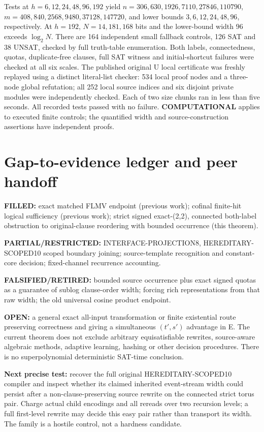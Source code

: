 \documentclass[11pt]{article}
\begin{document}
Tests at \(h=6,12,24,48,96,192\) yield \(n=306,630,1926,7110,27846,110790\), \(m=408,840,2568,9480,37128,147720\), and lower bounds \(3,6,12,24,48,96\), respectively. At \(h=192\), \(N=14{,}181{,}168\) bits and the lower-bound width \(96\) exceeds \(\log_2N\). There are 164 independent small fallback controls, 126 SAT and 38 UNSAT, checked by full truth-table enumeration. Both labels, connectedness, quotas, duplicate-free clauses, full SAT witness and initial-shortcut failures were checked at all six scales. The published original U local certificate was freshly replayed using a distinct literal-list checker: 534 local proof nodes and a three-node global refutation; all 252 local source indices and six disjoint private modules were independently checked. Each of two size chunks ran in less than five seconds. All recorded tests passed with no failure. \textbf{COMPUTATIONAL} applies to executed finite controls; the quantified width and source-construction assertions have independent proofs.

\section{Gap-to-evidence ledger and peer handoff}
\noindent\textbf{FILLED:} exact matched FLMV endpoint (previous work); cofinal finite-hit logical sufficiency (previous work); strict signed exact-(2,2), connected both-label obstruction to original-clause reordering with bounded occurrence (this theorem).
\par\noindent\textbf{PARTIAL/RESTRICTED:} INTERFACE-PROJECTION8, HEREDITARY-SCOPED10 scoped boundary joining; source-template recognition and constant-core decision; fixed-channel recurrence accounting.
\par\noindent\textbf{FALSIFIED/RETIRED:} bounded source occurrence plus exact signed quotas as a guarantee of sublog clause-order width; forcing rich representations from that raw width; the old universal cosine product endpoint.
\par\noindent\textbf{OPEN:} a general exact all-input transformation or finite existential route preserving correctness and giving a simultaneous \((t',s')\) advantage in E. The current theorem does not exclude arbitrary equisatisfiable rewrites, source-aware algebraic methods, adaptive learning, hashing or other decision procedures. There is no superpolynomial deterministic SAT-time conclusion.

\noindent\textbf{Next precise test:} recover the full original HEREDITARY-SCOPED10 compiler and inspect whether its claimed inherited event-stream width could persist after a non-clause-preserving source rewrite on the connected strict torus pair. Charge actual child encodings and all rereads over two recursion levels; a full first-level rewrite may decide this easy pair rather than transport its width. The family is a hostile control, not a hardness candidate.
\end{document}
